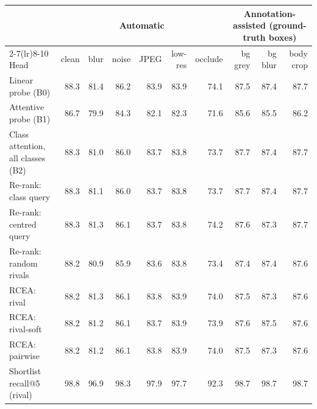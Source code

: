 \begin{tabular}{lrrrrrrrrr}
\toprule
 & \multicolumn{6}{c}{Automatic} & \multicolumn{3}{c}{Annotation-assisted (ground-truth boxes)} \\
\cmidrule(lr){2-7}\cmidrule(lr){8-10}
Head & clean & blur & noise & JPEG & low-res & occlude & bg grey & bg blur & body crop \\
\midrule
Linear probe (B0) & 88.3 & 81.4 & 86.2 & 83.9 & 83.9 & 74.1 & 87.5 & 87.4 & 87.7 \\
Attentive probe (B1) & 86.7 & 79.9 & 84.3 & 82.1 & 82.3 & 71.6 & 85.6 & 85.5 & 86.2 \\
Class attention, all classes (B2) & 88.3 & 81.0 & 86.0 & 83.7 & 83.8 & 73.7 & 87.7 & 87.4 & 87.7 \\
Re-rank: class query & 88.3 & 81.1 & 86.0 & 83.7 & 83.8 & 73.7 & 87.7 & 87.4 & 87.7 \\
Re-rank: centred query & 88.3 & 81.3 & 86.1 & 83.7 & 83.8 & 74.2 & 87.6 & 87.3 & 87.7 \\
Re-rank: random rivals & 88.2 & 80.9 & 85.9 & 83.6 & 83.8 & 73.4 & 87.4 & 87.4 & 87.6 \\
RCEA: rival & 88.2 & 81.3 & 86.1 & 83.8 & 83.9 & 74.0 & 87.5 & 87.3 & 87.6 \\
RCEA: rival-soft & 88.2 & 81.2 & 86.1 & 83.7 & 83.9 & 73.9 & 87.6 & 87.5 & 87.6 \\
RCEA: pairwise & 88.2 & 81.2 & 86.1 & 83.8 & 83.9 & 74.0 & 87.5 & 87.3 & 87.6 \\
\midrule
Shortlist recall@5 (rival) & 98.8 & 96.9 & 98.3 & 97.9 & 97.7 & 92.3 & 98.7 & 98.7 & 98.7 \\
\bottomrule
\end{tabular}
